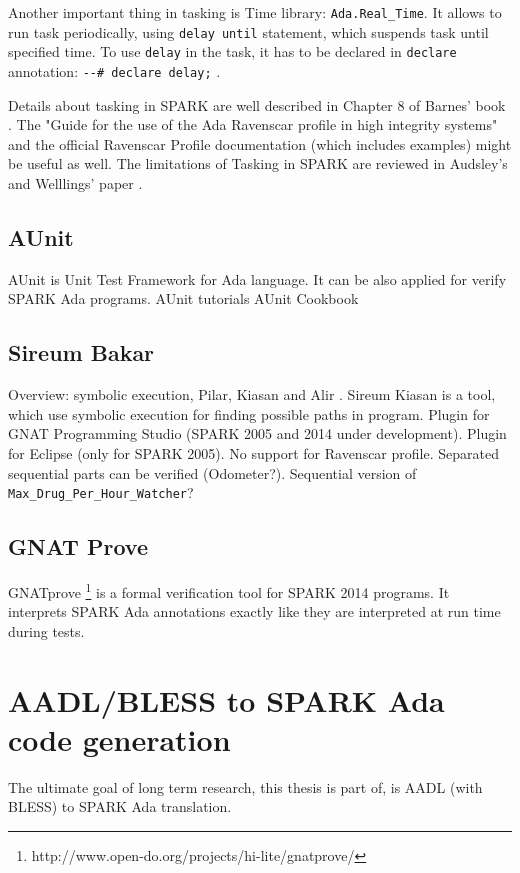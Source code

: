 Another important thing in tasking is Time library: \lstinline{Ada.Real_Time}. It allows to run task periodically, using \lstinline{delay until} statement, which suspends task until specified time. To use \lstinline{delay} in the task, it has to be declared in \lstinline{declare} annotation: \lstinline{--# declare delay;} \cite{Barnes:Book}.

Details about tasking in SPARK are well described in Chapter 8 of Barnes' book \cite{Barnes:Book}. The "Guide for the use of the Ada Ravenscar profile in high integrity systems" \cite{Ravenscar:Article} and the official Ravenscar Profile documentation (which includes examples) \cite{Ravenscar:Online} might be useful as well. The limitations of Tasking in SPARK are reviewed in Audsley's and Welllings' paper \cite{IssuesWithRavenscar:Paper}.


\subsection{AUnit}
\label{background:spark:aunit}
AUnit is Unit Test Framework for Ada language. It can be also applied for verify SPARK Ada programs.
AUnit tutorials \cite{AUnitTutorials:Online}
AUnit Cookbook \cite{AUnitCookbook:Online}


\subsection{Sireum Bakar}
\label{background:spark:sireum}
Overview: symbolic execution, Pilar, Kiasan and Alir \cite{Hari:Thesis}.
Sireum Kiasan \cite{Kiasan:Paper} is a tool, which use symbolic execution for finding possible paths in program.
Plugin for GNAT Programming Studio (SPARK 2005 and 2014 under development).
Plugin for Eclipse (only for SPARK 2005).
No support for Ravenscar profile.
Separated sequential parts can be verified (Odometer?). Sequential version of \lstinline{Max_Drug_Per_Hour_Watcher}?


\subsection{GNAT Prove}
\label{background:spark:gnatprove}
GNATprove \footnote{http://www.open-do.org/projects/hi-lite/gnatprove/} is a formal verification tool for SPARK 2014 programs. It interprets SPARK Ada annotations exactly like they are interpreted at run time during tests.


\section{AADL/BLESS to SPARK Ada code generation}
\label{background:codegen}
The ultimate goal of long term research, this thesis is part of, is AADL (with BLESS) to SPARK Ada translation.


